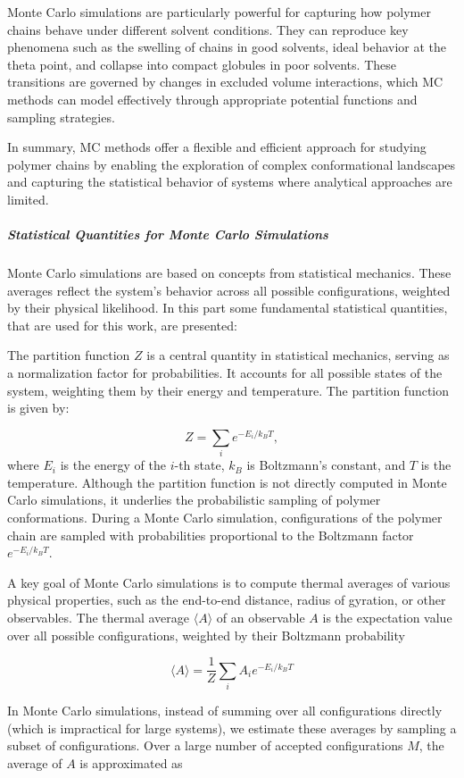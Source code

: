 \documentclass{article}      %
\begin{document}
Monte Carlo simulations are particularly powerful for capturing how polymer chains behave under different solvent conditions. They can reproduce key phenomena such as the swelling of chains in good solvents, ideal behavior at the theta point, and collapse into compact globules in poor solvents. These transitions are governed by changes in excluded volume interactions, which MC methods can model effectively through appropriate potential functions and sampling strategies.

In summary, MC methods offer a flexible and efficient approach for studying polymer chains by enabling the exploration of complex conformational landscapes and capturing the statistical behavior of systems where analytical approaches are limited.

\subparagraph{Statistical Quantities for Monte Carlo Simulations}

Monte Carlo simulations are based on concepts from statistical mechanics. These averages reflect the system’s behavior across all possible configurations, weighted by their physical likelihood. In this part some fundamental statistical quantities, that are used for this work, are presented:

The partition function \( Z \) is a central quantity in statistical mechanics, serving as a normalization factor for probabilities. It accounts for all possible states of the system, weighting them by their energy and temperature. The partition function is given by:

\[
Z = \sum_i e^{-E_i / k_B T} ,
\]
where \( E_i \) is the energy of the \( i \)-th state, \( k_B \) is Boltzmann’s constant, and \( T \) is the temperature. Although the partition function is not directly computed in Monte Carlo simulations, it underlies the probabilistic sampling of polymer conformations. During a Monte Carlo simulation, configurations of the polymer chain are sampled with probabilities proportional to the Boltzmann factor \( e^{-E_i / k_B T} \).

A key goal of Monte Carlo simulations is to compute thermal averages of various physical properties, such as the end-to-end distance, radius of gyration, or other observables. The thermal average \( \langle A \rangle \) of an observable \( A \) is the expectation value over all possible configurations, weighted by their Boltzmann probability

\[
\langle A \rangle = \frac{1}{Z} \sum_i A_i e^{-E_i / k_B T}
\]

In Monte Carlo simulations, instead of summing over all configurations directly (which is impractical for large systems), we estimate these averages by sampling a subset of configurations. Over a large number of accepted configurations \( M \), the average of \( A \) is approximated as
\end{document}
